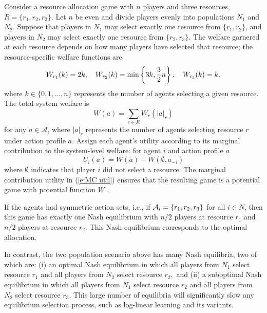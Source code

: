 \begin{example}\label{e:exIntro}
%
Consider a resource allocation game with $n$ players and three resources, $R = \{r_1,r_2,r_3\}.$  Let $n$ be even and divide players evenly into populations $N_1$ and $N_2.$ Suppose that players in $N_1$ may select exactly one resource from $\{r_1,r_2\}$, and players in $N_2$ may select exactly one resource from $\{r_2,r_3\}.$  The welfare garnered at each resource depends on how many players have selected that resource; the resource-specific welfare functions are 
$$W_{r_1}(k) =2k, \quad
W_{r_2}(k) = \min\left\{3k,{3\over 2}n\right\},\quad
W_{r_3}(k) =  k.$$
%
where $k\in \{0,1,\ldots,n\}$ represents the number of agents selecting a given resource. The total system welfare is $$W(a)=\sum_{r \in R} W_r(|a|_r)$$
for any $a\in \mathcal{A}$, where $|a|_r$ represents the number of agents selecting resource $r$ under action profile $a$.  Assign each agent's utility according to its marginal contribution to the system-level welfare: for agent $i$ and action profile $a$ 
%
\begin{equation}\label{e:MC util}
U_i(a) = W(a) - W(\emptyset,a_{-i})
\end{equation}
%
where $\emptyset$ indicates that player $i$ did not select a resource.  The marginal contribution utility in (\ref{e:MC util}) ensures that the resulting game is a potential game with potential function $W$ \cite{Wolpert1999}.  
%

If the agents had symmetric action sets, i.e., if ${\cal A}_i = \{r_1, r_2, r_3\}$ for all $i \in N$, then this game has exactly one Nash equilibrium with $n/2$ players at resource $r_1$ and $n/2$ players at resource $r_2.$  This Nash equilibrium corresponds to the optimal allocation.  

In contrast, the two population scenario above has many Nash equilibria, two of which are: (i) an optimal Nash equilibrium in which all players from $N_1$ select resource $r_1$ and all players from $N_2$ select resource $r_2,$ and (ii) a suboptimal Nash equilibrium in which all players from $N_1$ select resource $r_2$ and all players from $N_2$ select resource $r_3$.  This large number of equilibria will significantly slow any equilibrium selection process, such as log-linear learning and its variants.



\end{example}


